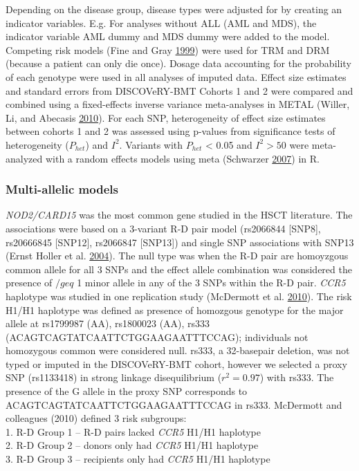 \documentclass[]{DissertateOSU}
\begin{document}
Depending on the disease group, disease types were adjusted for by
creating an indicator variables. E.g. For analyses without ALL (AML and
MDS), the indicator variable AML dummy and MDS dummy were added to the
model. Competing risk models (Fine and Gray
\protect\hyperlink{ref-fine1999}{1999}) were used for TRM and DRM
(because a patient can only die once). Dosage data accounting for the
probability of each genotype were used in all analyses of imputed data.
Effect size estimates and standard errors from DISCOVeRY-BMT Cohorts 1
and 2 were compared and combined using a fixed-effects inverse variance
meta-analyses in METAL (Willer, Li, and Abecasis
\protect\hyperlink{ref-metal}{2010}). For each SNP, heterogeneity of
effect size estimates between cohorts 1 and 2 was assessed using
p-values from significance tests of heterogeneity (\(P_{het}\)) and
\(I^{2}\). Variants with \(P_{het}\) \textless{} 0.05 and \(I^{2}>50\)
were meta-analyzed with a random effects models using meta (Schwarzer
\protect\hyperlink{ref-Schwarzer_2007}{2007}) in R.

\subsubsection{Multi-allelic models}\label{multi-allelic-models}

\emph{NOD2/CARD15} was the most common gene studied in the HSCT
literature. The associations were based on a 3-variant R-D pair model
(rs2066844 {[}SNP8{]}, rs20666845 {[}SNP12{]}, rs2066847 {[}SNP13{]})
and single SNP associations with SNP13 (Ernst Holler et al.
\protect\hyperlink{ref-holler_2004}{2004}). The null type was when the
R-D pair are homoyzgous common allele for all 3 SNPs and the effect
allele combination was considered the presence of \(/geq\) 1 minor
allele in any of the 3 SNPs within the R-D pair. \emph{CCR5} haplotype
was studied in one replication study (McDermott et al.
\protect\hyperlink{ref-mcdermott2010}{2010}). The risk H1/H1 haplotype
was defined as presence of homozgous genotype for the major allele at
rs1799987 (AA), rs1800023 (AA), rs333
(ACAGTCAGTATCAATTCTGGAAGAATTTCCAG); individuals not homozygous common
were considered null. rs333, a 32-basepair deletion, was not typed or
imputed in the DISCOVeRY-BMT cohort, however we selected a proxy SNP
(rs1133418) in strong linkage disequilibrium (\(r^2=0.97\)) with rs333.
The presence of the G allele in the proxy SNP corresponds to
ACAGTCAGTATCAATTCTGGAAGAATTTCCAG in rs333. McDermott and colleagues
(2010) defined 3 risk subgroups:\\
1. R-D Group 1 -- R-D pairs lacked \emph{CCR5} H1/H1 haplotype\\
2. R-D Group 2 -- donors only had \emph{CCR5} H1/H1 haplotype\\
3. R-D Group 3 -- recipients only had \emph{CCR5} H1/H1 haplotype
\end{document}

